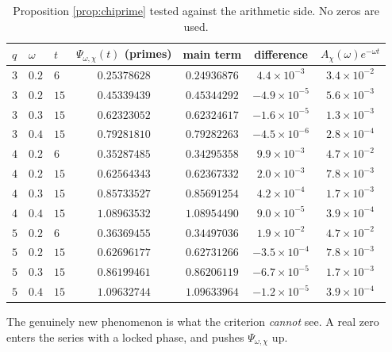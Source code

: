 \documentclass[11pt,reqno]{amsart}
\theoremstyle{plain}
\theoremstyle{definition}
\begin{document}
\begin{table}[htbp]
\centering
\begin{tabular}{@{}lllcccc@{}}
\toprule
$q$ & $\omega$ & $t$ & $\Psi_{\omega,\chi}(t)$ (primes) & main term & difference & $A_\chi(\omega)e^{-\omega t}$\\
\midrule
$3$ & $0.2$ & $6$  & $0.25378628$ & $0.24936876$ & $4.4\times10^{-3}$  & $3.4\times10^{-2}$\\
$3$ & $0.2$ & $15$ & $0.45339439$ & $0.45344292$ & $-4.9\times10^{-5}$ & $5.6\times10^{-3}$\\
$3$ & $0.3$ & $15$ & $0.62323052$ & $0.62324617$ & $-1.6\times10^{-5}$ & $1.3\times10^{-3}$\\
$3$ & $0.4$ & $15$ & $0.79281810$ & $0.79282263$ & $-4.5\times10^{-6}$ & $2.8\times10^{-4}$\\
$4$ & $0.2$ & $6$  & $0.35287485$ & $0.34295358$ & $9.9\times10^{-3}$  & $4.7\times10^{-2}$\\
$4$ & $0.2$ & $15$ & $0.62564343$ & $0.62367332$ & $2.0\times10^{-3}$  & $7.8\times10^{-3}$\\
$4$ & $0.3$ & $15$ & $0.85733527$ & $0.85691254$ & $4.2\times10^{-4}$  & $1.7\times10^{-3}$\\
$4$ & $0.4$ & $15$ & $1.08963532$ & $1.08954490$ & $9.0\times10^{-5}$  & $3.9\times10^{-4}$\\
$5$ & $0.2$ & $6$  & $0.36369455$ & $0.34497036$ & $1.9\times10^{-2}$  & $4.7\times10^{-2}$\\
$5$ & $0.2$ & $15$ & $0.62696177$ & $0.62731266$ & $-3.5\times10^{-4}$ & $7.8\times10^{-3}$\\
$5$ & $0.3$ & $15$ & $0.86199461$ & $0.86206119$ & $-6.7\times10^{-5}$ & $1.7\times10^{-3}$\\
$5$ & $0.4$ & $15$ & $1.09632744$ & $1.09633964$ & $-1.2\times10^{-5}$ & $3.9\times10^{-4}$\\
\bottomrule
\end{tabular}
\vspace{2mm}
\caption{Proposition \ref{prop:chiprime} tested against the arithmetic side. No zeros are used.}
\label{tab:chiprime}
\end{table}

The genuinely new phenomenon is what the criterion \emph{cannot} see. A real zero enters the
series with a locked phase, and pushes $\Psi_{\omega,\chi}$ up.
\end{document}
